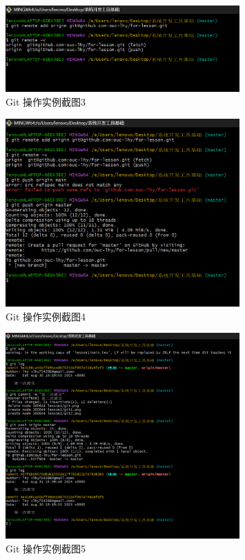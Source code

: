 \documentclass[a4paper, 12pt]{article}
\begin{document}
\begin{enumerate}
    \begin{figure}[htbp]
        \centering
        \includegraphics[width=0.8\textwidth]{git (3).png}
        \vspace{0.3cm} %
        \caption{Git 操作实例截图3}
        \label{fig:git-screenshot3}
    \end{figure}

    \begin{figure}[htbp]
        \centering
        \includegraphics[width=0.8\textwidth]{git (4).png}
        \vspace{0.3cm} %
        \caption{Git 操作实例截图4}
        \label{fig:git-screenshot4}
    \end{figure}

    \begin{figure}[htbp]
        \centering
        \includegraphics[width=0.8\textwidth]{git (5).png}
        \vspace{0.3cm} %
        \caption{Git 操作实例截图5}
        \label{fig:git-screenshot5}
    \end{figure}


\end{enumerate}
\end{document}
